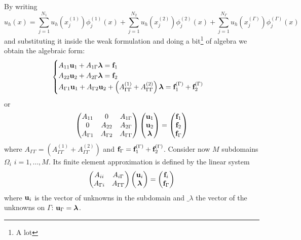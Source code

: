 By writing 
\[
    u_h(x) = \sum_{j=1}^{N_1} u_h(x_j^{(1)}) \phi^{(1)}_j(x) + \sum_{j=1}^{N_2} u_h(x_j^{(2)})\phi_j^{(2)}(x) + \sum_{j=1}^{N_\Gamma} u_h(x_j^{(\Gamma)})\phi_j^{(\Gamma)}(x)
\]
and substituting it inside the weak formulation and doing a bit\footnote[80]{A lot} of algebra we obtain the algebraic form:
\[
    \begin{cases}
        A_{11} \textbf{u}_1 + A_{1\Gamma} \bm{\lambda} = \textbf{f}_1 \\
        A_{22} \textbf{u}_2 + A_{2\Gamma} \bm{\lambda} = \textbf{f}_2 \\
        A_{\Gamma 1} \textbf{u}_1 + A_{\Gamma 2}\textbf{u}_2 + \left( A_{\Gamma \Gamma}^{(1)} + A^{(2)}_{\Gamma \Gamma} \right) \bm{\lambda} = \textbf{f}^{(\Gamma)}_1 + \textbf{f}^{(\Gamma)}_2
    \end{cases}
\]
or 
\[
    \left( \begin{matrix}
        A_{11} & 0 & A_{1\Gamma} \\ 0 & A_{22} & A_{2\Gamma} \\ A_{\Gamma 1} & A_{\Gamma 2} & A_{\Gamma\Gamma}
    \end{matrix} \right) \left( \begin{matrix}
        \textbf{u}_1 \\ \textbf{u}_2 \\ \bm{\lambda}
    \end{matrix} \right) = \left( \begin{matrix}
        \textbf{f}_1 \\ \textbf{f}_2 \\ \textbf{f}_{\Gamma}
    \end{matrix} \right)
\]
where \(A_{\Gamma\Gamma} = \left( A_{\Gamma\Gamma}^{(1)} + A_{\Gamma\Gamma}^{(2)} \right)\) and \(\textbf{f}_\Gamma =  \textbf{f}_1^{(\Gamma)} + \textbf{f}_2^{(\Gamma)}\).
Consider now \(M\) subdomains \(\Omega_i\) \(i = 1,\ldots, M\). Its finite element approximation is defined by the linear system
\[
    \left( \begin{matrix}
        A_{ii} & A_{i\Gamma} \\ A_{\Gamma i} & A_{\Gamma \Gamma}
    \end{matrix} \right) \left( \begin{matrix}
        \textbf{u}_i \\ \bm{\lambda}
    \end{matrix} \right) = \left( \begin{matrix}
        \textbf{f}_i \\ \textbf{f}_{\Gamma}
    \end{matrix} \right)
\]
where \(\textbf{u}_i\) is the vector of unknowns in the subdomain and \(\bm_{\lambda}\) the vector of the unknowns on \(\Gamma\): \(\textbf{u}_\Gamma = \bm{\lambda}\). 
